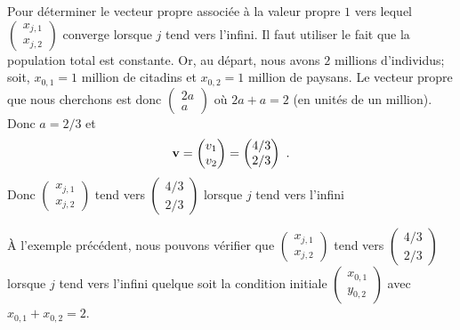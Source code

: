 {\begin{egg}
Pour déterminer le vecteur propre associée à la valeur propre $1$ vers
lequel $\displaystyle \begin{pmatrix} x_{j,1} \\ x_{j,2} \end{pmatrix}$
converge lorsque $j$ tend vers l'infini.  Il faut utiliser le fait que
la population total est constante.  Or, au départ, nous avons $2$ millions
d'individus; soit, $x_{0,1} = 1$ million de citadins et $x_{0,2} = 1$
million de paysans.  Le vecteur propre que nous cherchons est donc
$\displaystyle \begin{pmatrix} 2a \\ a \end{pmatrix}$ où $2a + a = 2$
(en unités de un million).  Donc $a=2/3$ et
\[
  \mathbf{v} = \begin{pmatrix} v_1 \\ v_2 \end{pmatrix} =
  \begin{pmatrix} 4/3 \\ 2/3 \end{pmatrix} \ .
\]
Donc $\displaystyle \begin{pmatrix} x_{j,1} \\ x_{j,2} \end{pmatrix}$
tend vers $\displaystyle \begin{pmatrix} 4/3 \\ 2/3 \end{pmatrix}$
lorsque $j$ tend vers l'infini
\end{egg}

\begin{rmk}[\theory]
À l'exemple précédent, nous pouvons vérifier que 
$\displaystyle \begin{pmatrix} x_{j,1} \\ x_{j,2} \end{pmatrix}$ tend vers
$\displaystyle \begin{pmatrix} 4/3 \\ 2/3 \end{pmatrix}$ lorsque $j$
tend vers l'infini quelque soit la condition initiale
$\displaystyle \begin{pmatrix} x_{0,1} \\ y_{0,2} \end{pmatrix}$ avec
$x_{0,1} + x_{0,2} = 2$.


\end{rmk}}
